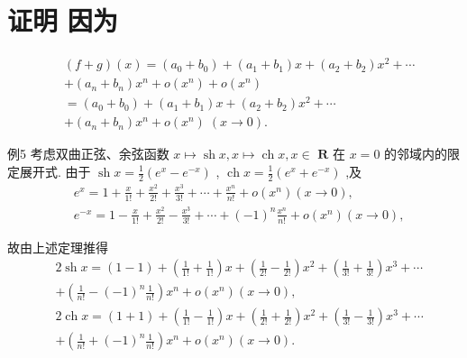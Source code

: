 \section*{证明 因为}
\begin{align*}
	&\left( {f + g}\right) \left( x\right)  = \left( {{a}_{0} + {b}_{0}}\right)  + \left( {{a}_{1} + {b}_{1}}\right) x + \left( {{a}_{2} + {b}_{2}}\right) {x}^{2} + \cdots\\
	&+ \left( {{a}_{n} + {b}_{n}}\right) {x}^{n} + o\left( {x}^{n}\right)  + o\left( {x}^{n}\right)\\
	&= \left( {{a}_{0} + {b}_{0}}\right)  + \left( {{a}_{1} + {b}_{1}}\right) x + \left( {{a}_{2} + {b}_{2}}\right) {x}^{2} + \cdots\\
	&+ \left( {{a}_{n} + {b}_{n}}\right) {x}^{n} + o\left( {x}^{n}\right) \;\left( {x \rightarrow  0}\right) .
\end{align*}

例5 考虑双曲正弦、余弦函数 $x \mapsto  \operatorname{sh}x,x \mapsto  \operatorname{ch}x,x \in$  $\mathbf{R}$ 在 $x = 0$ 的邻域内的限定展开式. 由于 $\operatorname{sh}x = \frac{1}{2}\left( {{e}^{x} - {e}^{-x}}\right)$ , $\operatorname{ch}x = \frac{1}{2}\left( {{e}^{x} + {e}^{-x}}\right)$ ,及
\begin{align*}
	&{e}^{x} = 1 + \frac{x}{1!} + \frac{{x}^{2}}{2!} + \frac{{x}^{3}}{3!} + \cdots  + \frac{{x}^{n}}{n!} + o\left( {x}^{n}\right) \left( {x \rightarrow  0}\right) ,\\
	&{e}^{-x} = 1 - \frac{x}{1!} + \frac{{x}^{2}}{2!} - \frac{{x}^{3}}{3!} + \cdots  + {\left( -1\right) }^{n}\frac{{x}^{n}}{n!} + o\left( {x}^{n}\right) \left( {x \rightarrow  0}\right) ,
\end{align*}

故由上述定理推得
\begin{align*}
	&2\operatorname{sh}x = \left( {1 - 1}\right)  + \left( {\frac{1}{1!} + \frac{1}{1!}}\right) x + \left( {\frac{1}{2!} - \frac{1}{2!}}\right) {x}^{2} + \left( {\frac{1}{3!} + \frac{1}{3!}}\right) {x}^{3} + \cdots\\
	&+ \left( {\frac{1}{n!} - {\left( -1\right) }^{n}\frac{1}{n!}}\right) {x}^{n} + o\left( {x}^{n}\right) \left( {x \rightarrow  0}\right) ,\\
	&2\operatorname{ch}x = \left( {1 + 1}\right)  + \left( {\frac{1}{1!} - \frac{1}{1!}}\right) x + \left( {\frac{1}{2!} + \frac{1}{2!}}\right) {x}^{2} + \left( {\frac{1}{3!} - \frac{1}{3!}}\right) {x}^{3} + \cdots\\
	&+ \left( {\frac{1}{n!} + {\left( -1\right) }^{n}\frac{1}{n!}}\right) {x}^{n} + o\left( {x}^{n}\right) \left( {x \rightarrow  0}\right) .
\end{align*}

